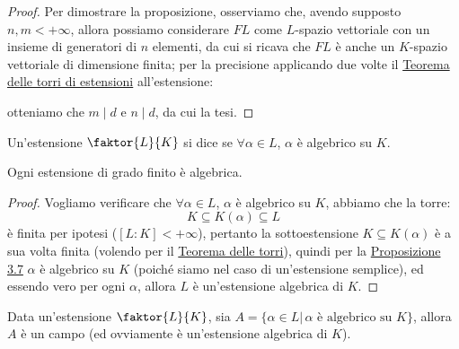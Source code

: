 \documentclass[11pt]{scrartcl}
\begin{document}
\begin{proof}
Per dimostrare la proposizione, osserviamo che, avendo supposto $n,m < +\infty$, allora possiamo considerare $FL$ come $L$-spazio vettoriale con un insieme di generatori di $n$ elementi,
da cui si ricava che $FL$ è anche un $K$-spazio vettoriale di dimensione finita; per la precisione applicando due volte il \hyperref[torri]{Teorema delle torri di estensioni} all'estensione:
\begin{center}
\end{center}
otteniamo che $m \mid d$ e $n \mid d$, da cui la tesi.
\end{proof}

\begin{definition}
    Un'estensione $\faktor{L}{K}$ si dice  se $\forall \alpha \in L$, $\alpha$ è algebrico su $K$.
\end{definition}

\begin{proposition}
    \label{3.12}
    Ogni estensione di grado finito è algebrica.
\end{proposition}

\begin{proof}
    Vogliamo verificare che $\forall \alpha \in L$, $\alpha$ è algebrico su $K$, abbiamo che la torre:
    \[ K \subseteq K(\alpha) \subseteq L
        \]
    è finita per ipotesi ($[L : K] < +\infty$), pertanto la sottoestensione $K \subseteq K(\alpha)$ è a sua volta finita (volendo per il \hyperref[torri]{Teorema delle torri}),
    quindi per la \hyperref[3.7]{Proposizione 3.7} $\alpha$ è algebrico su $K$ (poiché siamo nel caso di un'estensione semplice), ed essendo vero per ogni $\alpha$, allora $L$ è un'estensione algebrica di $K$.
\end{proof}

\begin{proposition}
    \label{3.13}
    Data un'estensione $\faktor{L}{K}$, sia $A = \{\alpha \in L | \, \text{$\alpha$ è algebrico su $K$}\}$, allora $A$ è un campo (ed ovviamente
    è un'estensione algebrica di $K$).
\end{proposition}
\end{document}
